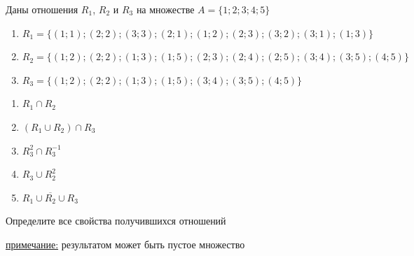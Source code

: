 \question
Даны отношения $R_1$, $R_2$ и $R_3$ на множестве $A = \{1; 2; 3; 4; 5\}$ 
\begin{enumerate}
	\renewcommand{\labelenumi}{\alph{enumi})}
	\item $R_1 = \{(1; 1); (2; 2); (3; 3); (2; 1); (1; 2); (2; 3); (3; 2); (3; 1); (1; 3)\}$
	\item $R_2 = \{(1; 2); (2; 2); (1; 3); (1; 5); (2; 3); (2; 4); (2; 5); (3; 4); (3; 5); (4; 5)\}$
	\item $R_3 = \{(1; 2); (2; 2); (1; 3); (1; 5); (3; 4); (3; 5); (4; 5)\}$
\end{enumerate}

\begin{enumerate}
	\renewcommand{\labelenumi}{\alph{enumi})}
	\item $R_1 \cap R_2$
	\item $(R_1 \cup R_2) \cap R_3$
	\item $R_3^2 \cap R_3^{-1}$
	\item $R_3 \cup R_2^2$
	\item $R_1 \cup \overline{R_2} \cup R_3$
\end{enumerate}

Определите все свойства получившихся отношений

\underline{примечание:} результатом может быть пустое множество